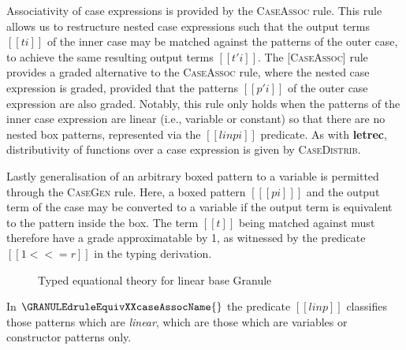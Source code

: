 Associativity of case expressions is provided by the
\textsc{CaseAssoc} rule. This rule allows us to restructure nested
case expressions such that the output terms $[[ ti ]]$ of the inner
case may be matched against the patterns of the outer case, to achieve
the same resulting output terms $[[ t'i ]]$. The \textsc{[CaseAssoc]}
rule provides a graded alternative to the \textsc{CaseAssoc} rule,
where the nested case expression is graded, provided that the patterns
$[[ p'i ]]$ of the outer case expression are also graded. Notably,
this rule only holds when the patterns of the inner case expression
are linear (i.e., variable or constant) so that there are no nested box patterns, represented via the $[[ lin pi ]]$ predicate. As with \textbf{letrec}, distributivity of functions over a case expression is given by \textsc{CaseDistrib}.


Lastly generalisation of an arbitrary boxed pattern to a variable is permitted through the \textsc{CaseGen} rule. Here, a boxed pattern $[[  [pi] ]]$ and the output term of the case may be converted to a variable if the output term is equivalent to the pattern inside the box. The term $[[t]]$ being matched against must therefore have a grade approximatable by 1, as witnessed by the predicate $[[ 1 <<= r ]]$ in the typing derivation.




  \begin{figure}
{}
\label{fig:typed-eqt}
\caption{Typed equational theory for linear base Granule}
\end{figure}
%
In $\GRANULEdruleEquivXXcaseAssocName{}$
the predicate $[[ lin p ]]$ classifies those
patterns which are \emph{linear}, which are those which
are variables or constructor patterns only.

